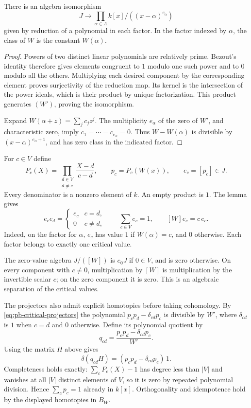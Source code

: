 \begin{lemma}
\label{lem:pb-critical-projectors}
There is an algebra isomorphism
\[
 J\longrightarrow
 \prod_{\alpha\in A} k[x]/((x-\alpha)^{e_\alpha})
\]
given by reduction of a polynomial in each factor.
In the factor indexed by \(\alpha\), the class of \(W\) is
the constant \(W(\alpha)\).
\end{lemma}
\begin{proof}
Powers of two distinct linear polynomials are relatively prime.
Bezout's identity therefore gives elements congruent to \(1\)
modulo one such power and to \(0\) modulo all the others.
Multiplying each desired component by the corresponding element
proves surjectivity of the reduction map. Its kernel is the
intersection of the power ideals, which is their product by
unique factorization. This product generates \((W')\), proving
the isomorphism.

Expand \(W(\alpha+z)=\sum_j c_jz^j\).
The multiplicity \(e_\alpha\) of the zero of \(W'\), and
characteristic zero, imply \(c_1=\cdots=c_{e_\alpha}=0\).
Thus \(W-W(\alpha)\) is divisible by
\((x-\alpha)^{e_\alpha+1}\), and has zero class in the indicated
factor.
\end{proof}

For \(c\in V\) define
\[
 P_c(X)=\prod_{\substack{d\in V\\d\ne c}}\frac{X-d}{c-d},
 \qquad p_c=P_c(W(x)),\qquad e_c=[p_c]\in J.
\]
Every denominator is a nonzero element of \(k\).
An empty product is \(1\). The lemma gives
\begin{equation}
 e_ce_d=\begin{cases}e_c&c=d,\\0&c\ne d,\end{cases}
 \qquad \sum_{c\in V}e_c=1,\qquad
 [W]e_c=c\,e_c.
 \label{eq:pb-critical-projectors}
\end{equation}
Indeed, on the factor for \(\alpha\), \(e_c\) has value \(1\)
if \(W(\alpha)=c\), and \(0\) otherwise. Each factor belongs to
exactly one critical value.

The zero-value algebra \(J/([W])\) is \(e_0J\) if \(0\in V\),
and is zero otherwise. On every component with \(c\ne0\),
multiplication by \([W]\) is multiplication by the invertible
scalar \(c\); on the zero component it is zero.
This is an algebraic separation of the critical values.

The projectors also admit explicit homotopies before taking
cohomology. By \eqref{eq:pb-critical-projectors} the polynomial
\(p_cp_d-\delta_{cd}p_c\) is divisible by
\(W'\), where \(\delta_{cd}\) is \(1\) when \(c=d\) and \(0\)
otherwise. Define its polynomial quotient by
\[
 q_{cd}=\frac{p_cp_d-\delta_{cd}p_c}{W'}.
\]
Using the matrix \(H\) above gives
\[
 \delta(q_{cd}H)=(p_cp_d-\delta_{cd}p_c)\,1.
\]
Completeness holds exactly: \(\sum_cP_c(X)-1\) has degree less
than \(|V|\) and vanishes at all \(|V|\) distinct elements of \(V\),
so it is zero by repeated polynomial division. Hence
\(\sum_cp_c=1\) already in \(k[x]\). Orthogonality and idempotence
hold by the displayed homotopies in \(B_W\).

